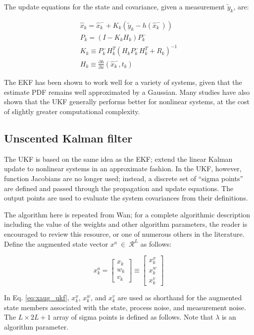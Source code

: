 \documentclass[]{article}
\begin{document}
The update equations for the state and covariance, given a measurement $\tilde{y}_k$, are:

\begin{align}
\hat{x}_k = \hat{x}_k^- + K_k(\tilde{y}_k-h(\hat{x}_k^-)) \\
P_k = (I-K_kH_k)P_k^- \\
K_k \equiv P_k^- H_k^T (H_k P_k^- H_k^T + R_k)^{-1} \\
H_k \equiv \frac{\partial h}{\partial x} (\hat{x}_k^-,t_k)
\end{align}

The EKF has been shown to work well for a variety of systems, given that the estimate PDF remains well approximated by a Gaussian. Many studies have also shown that the UKF generally performs better for nonlinear systems, at the cost of slightly greater computational complexity.

\subsection{Unscented Kalman filter}

The UKF is based on the same idea as the EKF; extend the linear Kalman update to nonlinear systems in an approximate fashion. In the UKF, however, function Jacobians are no longer used; instead, a discrete set of ``sigma points'' are defined and passed through the propagation and update equations. The output points are used to evaluate the system covariances from their definitions.

The algorithm here is repeated from Wan\cite{wan2000}; for a complete algorithmic description including the value of the weights and other algorithm parameters, the reader is encouraged to review this resource, or one of numerous others in the literature. Define the augmented state vector $x^a \ \in \ \mathcal{R}^L$ as follows:

\begin{equation}
x^a_k = \begin{bmatrix}
x_k \\w_k \\v_k
\end{bmatrix} \equiv \begin{bmatrix}
x^x_k \\x^w_k \\x^v_k
\end{bmatrix}
\label{eq:xaug_ukf}
\end{equation}

In Eq. \ref{eq:xaug_ukf}, $x^x_k$, $x^w_k$, and $x^v_k$ are used as shorthand for the augmented state members associated with the state, process noise, and measurement noise. The $L \times 2L+1$ array of sigma points is defined as follows. Note that $\lambda$ is an algorithm parameter.
\end{document}
